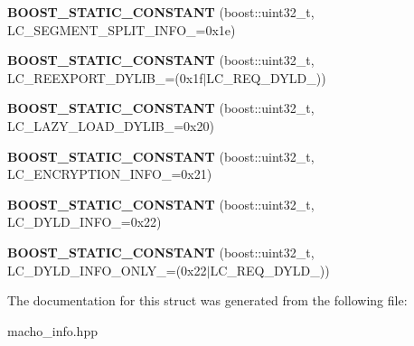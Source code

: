 \begin{DoxyCompactItemize}
\item 
{\bfseries B\+O\+O\+S\+T\+\_\+\+S\+T\+A\+T\+I\+C\+\_\+\+C\+O\+N\+S\+T\+A\+NT} (boost\+::uint32\+\_\+t, L\+C\+\_\+\+S\+E\+G\+M\+E\+N\+T\+\_\+\+S\+P\+L\+I\+T\+\_\+\+I\+N\+F\+O\+\_\+=0x1e)\hypertarget{a00194_a1d748241537cdf48cae6d7c2ad3dd46c}{}\label{a00194_a1d748241537cdf48cae6d7c2ad3dd46c}

\item 
{\bfseries B\+O\+O\+S\+T\+\_\+\+S\+T\+A\+T\+I\+C\+\_\+\+C\+O\+N\+S\+T\+A\+NT} (boost\+::uint32\+\_\+t, L\+C\+\_\+\+R\+E\+E\+X\+P\+O\+R\+T\+\_\+\+D\+Y\+L\+I\+B\+\_\+=(0x1f$\vert$\+L\+C\+\_\+\+R\+E\+Q\+\_\+\+D\+Y\+L\+D\+\_\+))\hypertarget{a00194_a0247764b2b43e242f023b0eebc837a0a}{}\label{a00194_a0247764b2b43e242f023b0eebc837a0a}

\item 
{\bfseries B\+O\+O\+S\+T\+\_\+\+S\+T\+A\+T\+I\+C\+\_\+\+C\+O\+N\+S\+T\+A\+NT} (boost\+::uint32\+\_\+t, L\+C\+\_\+\+L\+A\+Z\+Y\+\_\+\+L\+O\+A\+D\+\_\+\+D\+Y\+L\+I\+B\+\_\+=0x20)\hypertarget{a00194_ac214e94605692e614cd5807fdbbd102c}{}\label{a00194_ac214e94605692e614cd5807fdbbd102c}

\item 
{\bfseries B\+O\+O\+S\+T\+\_\+\+S\+T\+A\+T\+I\+C\+\_\+\+C\+O\+N\+S\+T\+A\+NT} (boost\+::uint32\+\_\+t, L\+C\+\_\+\+E\+N\+C\+R\+Y\+P\+T\+I\+O\+N\+\_\+\+I\+N\+F\+O\+\_\+=0x21)\hypertarget{a00194_af5741adbd7ba5f8147f3422f53c75a56}{}\label{a00194_af5741adbd7ba5f8147f3422f53c75a56}

\item 
{\bfseries B\+O\+O\+S\+T\+\_\+\+S\+T\+A\+T\+I\+C\+\_\+\+C\+O\+N\+S\+T\+A\+NT} (boost\+::uint32\+\_\+t, L\+C\+\_\+\+D\+Y\+L\+D\+\_\+\+I\+N\+F\+O\+\_\+=0x22)\hypertarget{a00194_ad9858a5a2228c52eaa996be04500887e}{}\label{a00194_ad9858a5a2228c52eaa996be04500887e}

\item 
{\bfseries B\+O\+O\+S\+T\+\_\+\+S\+T\+A\+T\+I\+C\+\_\+\+C\+O\+N\+S\+T\+A\+NT} (boost\+::uint32\+\_\+t, L\+C\+\_\+\+D\+Y\+L\+D\+\_\+\+I\+N\+F\+O\+\_\+\+O\+N\+L\+Y\+\_\+=(0x22$\vert$\+L\+C\+\_\+\+R\+E\+Q\+\_\+\+D\+Y\+L\+D\+\_\+))\hypertarget{a00194_aa651d683de90922a7a1e8234a06faa79}{}\label{a00194_aa651d683de90922a7a1e8234a06faa79}

\end{DoxyCompactItemize}


The documentation for this struct was generated from the following file\+:\begin{DoxyCompactItemize}
\item 
macho\+\_\+info.\+hpp\end{DoxyCompactItemize}
